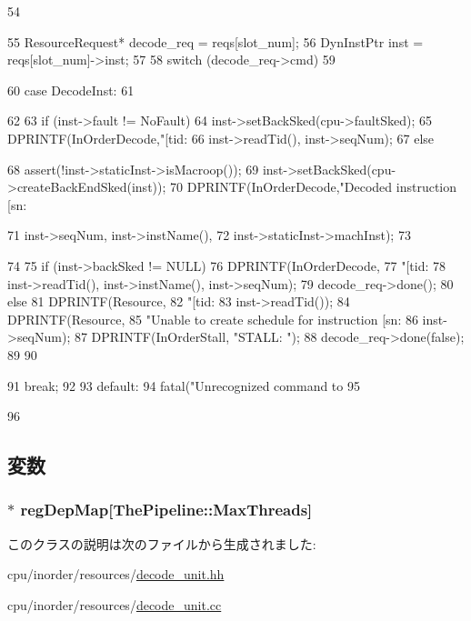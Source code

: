 \begin{DoxyCode}
54 {
55     ResourceRequest* decode_req = reqs[slot_num];
56     DynInstPtr inst = reqs[slot_num]->inst;
57 
58     switch (decode_req->cmd)
59     {
60       case DecodeInst:
61         {
62 
63             if (inst->fault != NoFault) {
64                 inst->setBackSked(cpu->faultSked);
65                 DPRINTF(InOrderDecode,"[tid:%
66                         inst->readTid(), inst->seqNum);
67             } else {
68                 assert(!inst->staticInst->isMacroop());
69                 inst->setBackSked(cpu->createBackEndSked(inst));
70                 DPRINTF(InOrderDecode,"Decoded instruction [sn:%
      
71                         inst->seqNum, inst->instName(),
72                         inst->staticInst->machInst);
73             }
74 
75             if (inst->backSked != NULL) {
76                 DPRINTF(InOrderDecode,
77                     "[tid:%
78                         inst->readTid(), inst->instName(), inst->seqNum);
79                 decode_req->done();
80             } else {
81                 DPRINTF(Resource,
82                     "[tid:%
83                         inst->readTid());
84                 DPRINTF(Resource,
85                     "Unable to create schedule for instruction [sn:%
86                     inst->seqNum);
87                 DPRINTF(InOrderStall, "STALL: \n");
88                 decode_req->done(false);
89             }
90         }
91         break;
92 
93       default:
94         fatal("Unrecognized command to %
95     }
96 }
\end{DoxyCode}


\subsection{変数}
\hypertarget{classDecodeUnit_aa0933c90c5ced66e85669c2982b165a6}{
\subsubsection[{regDepMap}]{$\ast$ {\bf regDepMap}\mbox{[}{\bf ThePipeline::MaxThreads}\mbox{]}}}
\label{classDecodeUnit_aa0933c90c5ced66e85669c2982b165a6}


このクラスの説明は次のファイルから生成されました:\begin{DoxyCompactItemize}
\item 
cpu/inorder/resources/\hyperlink{decode__unit_8hh}{decode\_\-unit.hh}\item 
cpu/inorder/resources/\hyperlink{decode__unit_8cc}{decode\_\-unit.cc}\end{DoxyCompactItemize}
